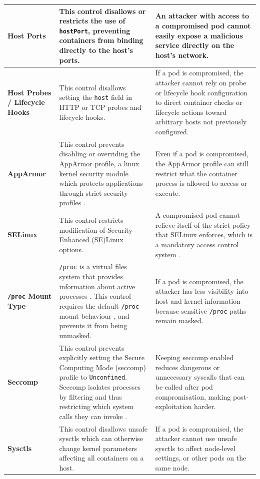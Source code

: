 \documentclass[11pt,a4paper]{article}
\begin{document}
\begin{longtable}{|p{2.5cm}|p{5.4cm}|p{6.2cm}|}
		\textbf{Host Ports} &
		This control disallows or restricts the use of \texttt{hostPort}, preventing containers from binding directly to the host's ports. &
		An attacker with access to a compromised pod cannot easily expose a malicious service directly on the host's network. \\
		\hline
		
		\textbf{Host Probes / Lifecycle Hooks} &
		This control disallows setting the \texttt{host} field in HTTP or TCP probes and lifecycle hooks. &
		If a pod is compromised, the attacker cannot rely on probe or lifecycle hook configuration to direct container checks or lifecycle actions toward arbitrary hosts not previously configured.\\
		\hline
		
		\textbf{AppArmor} &
		This control prevents disabling or overriding the AppArmor profile, a linux kernel security module which protects applications through strict security profiles \cite{ AppArmor Technical Documentation}. &
		Even if a pod is compromised, the AppArmor profile can still restrict what the container process is allowed to access or execute. \\
		\hline
		
		\textbf{SELinux} &
		This control restricts modification of Security-Enhanced (SE)Linux options.  &
		A compromised pod cannot relieve itself of the strict policy that SELinux enforces, which is a mandatory access control system \cite{Meeting criticical security obejctives with security-enahnce linux}.  \\
		\hline
		
		\textbf{\texttt{/proc} Mount Type} &
		\texttt{/proc} is a virtual files system that provides information about active processes \cite{selfservice linux}. This control requires the default \texttt{/proc} mount behaviour , and prevents it from being unmasked. &
		If a pod is compromised, the attacker has less visibility into host and kernel information because sensitive \texttt{/proc} paths remain masked. \\
		\hline
		
		\textbf{Seccomp} &
		This control prevents explicitly setting the Secure Computing Mode (seccomp) profile to \texttt{Unconfined}. Seccomp isolates processes by filtering and thus restricting which system calls they can invoke \cite{automating seccomp filter generation for linux applications}. &
		Keeping seccomp enabled reduces dangerous or unnecessary syscalls that can be called after pod compromisation, making post-exploitation harder. \\
		\hline
		
		\textbf{Sysctls} &
		This control disallows unsafe sysctls which can otherwise change kernel parameters affecting all containers on a host. \cite{ADAPTIVE KERNEL PARAMETER ADJUSTMENT VIA SHELL SCRIPTING} &
		If a pod is compromised, the attacker cannot use unsafe sysctls to affect node-level settings, or other pods on the same node. \\
		\hline
		
	\end{longtable}
	
\end{document}
